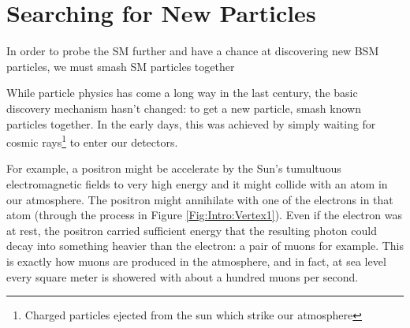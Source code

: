 \chapter{Searching for New Particles}\label{Sec:CMS}
In order to probe the SM further and have a chance at discovering new BSM particles, we must smash SM particles together 

While particle physics has come a long way in the last century, the basic discovery mechanism hasn't changed: to get a new particle, smash known particles together. In the early days, this was achieved by simply waiting for cosmic rays\footnote{Charged particles ejected from the sun which strike our atmosphere} to enter our detectors.

For example, a positron might be accelerate by the Sun's tumultuous electromagnetic fields to very high energy and it might collide with an atom in our atmosphere. The positron might annihilate with one of the electrons in that atom (through the process in Figure \ref{Fig:Intro:Vertex1}). Even if the electron was at rest, the positron carried sufficient energy that the resulting photon could decay into something heavier than the electron: a pair of muons for example. This is exactly how muons are produced in the atmosphere, and in fact, at sea level every square meter is showered with about a hundred muons per second.

